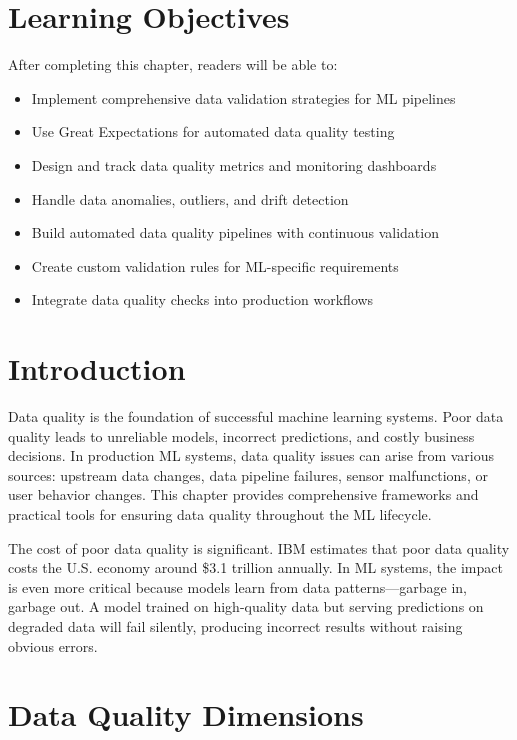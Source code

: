 \section{Learning Objectives}

After completing this chapter, readers will be able to:
\begin{itemize}
    \item Implement comprehensive data validation strategies for ML pipelines
    \item Use Great Expectations for automated data quality testing
    \item Design and track data quality metrics and monitoring dashboards
    \item Handle data anomalies, outliers, and drift detection
    \item Build automated data quality pipelines with continuous validation
    \item Create custom validation rules for ML-specific requirements
    \item Integrate data quality checks into production workflows
\end{itemize}

\section{Introduction}

Data quality is the foundation of successful machine learning systems. Poor data quality leads to unreliable models, incorrect predictions, and costly business decisions. In production ML systems, data quality issues can arise from various sources: upstream data changes, data pipeline failures, sensor malfunctions, or user behavior changes. This chapter provides comprehensive frameworks and practical tools for ensuring data quality throughout the ML lifecycle.

The cost of poor data quality is significant. IBM estimates that poor data quality costs the U.S. economy around \$3.1 trillion annually. In ML systems, the impact is even more critical because models learn from data patterns—garbage in, garbage out. A model trained on high-quality data but serving predictions on degraded data will fail silently, producing incorrect results without raising obvious errors.

\section{Data Quality Dimensions}

